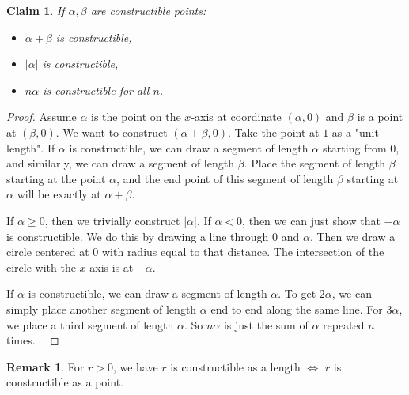 \documentclass{article}
\theoremstyle{plain}
\newtheorem{claim}{Claim}
\theoremstyle{definition}
\newtheorem{rem}{Remark}
\begin{document}
\begin{claim}
    If $\alpha, \beta$ are constructible points: \begin{itemize}
        \item $\alpha + \beta$ is constructible,
        \item $|\alpha|$ is constructible,
        \item $n\alpha$ is constructible for all $n$.
    \end{itemize}
\end{claim}

\begin{proof}
    Assume $\alpha$ is the point on the $x$-axis at coordinate $(\alpha, 0)$ and $\beta$ is a point at $(\beta, 0)$. We want to construct $(\alpha + \beta, 0)$. Take the point at $1$ as a "unit length". If $\alpha$ is constructible, we can draw a segment of length $\alpha$ starting from $0$, and similarly, we can draw a segment of length $\beta$. Place the segment of length $\beta$ starting at the point $\alpha$, and the end point of this segment of length $\beta$ starting at $\alpha$ will be exactly at $\alpha + \beta$. \checkmark

If $\alpha \geq 0$, then we trivially construct $|\alpha|$. If $\alpha < 0$, then we can just show that $-\alpha$ is constructible. We do this by drawing a line through $0$ and $\alpha$. Then we draw a circle centered at $0$ with radius equal to that distance. The intersection of the circle with the $x$-axis is at $-\alpha$. \checkmark

If $\alpha$ is constructible, we can draw a segment of length $\alpha$. To get $2\alpha$, we can simply place another segment of length $\alpha$ end to end along the same line. For $3\alpha$, we place a third segment of length $\alpha$. So $n\alpha$ is just the sum of $\alpha$ repeated $n$ times. \checkmark\
\end{proof}




\begin{rem}
    For $r > 0$, we have $r$ is constructible as a length $\iff$ $r$ is constructible as a point.
\end{rem}
\end{document}
